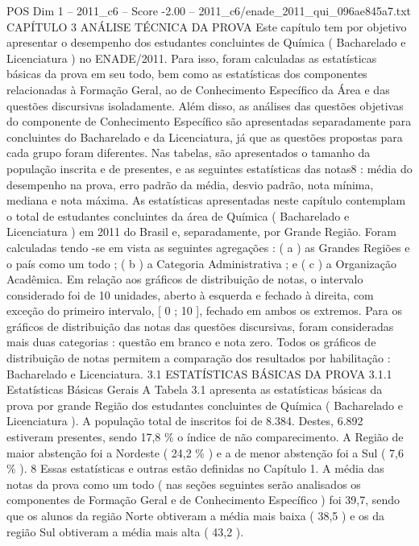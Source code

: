 \begin{textsample}{POS Dim 1 – 2011\_c6 – Score -2.00 – 2011\_c6/enade\_2011\_qui\_096ae845a7.txt}  \label{ex:f1_pos_218}
CAPÍTULO 3 ANÁLISE TÉCNICA DA PROVA Este capítulo tem por objetivo apresentar o desempenho dos estudantes concluintes de Química ( Bacharelado e Licenciatura ) no ENADE/2011.
Para isso, foram calculadas as estatísticas básicas da prova em seu todo, bem como as estatísticas dos componentes relacionadas à Formação Geral, ao de Conhecimento Específico da Área e das questões discursivas isoladamente.
Além disso, as análises das questões objetivas do componente de Conhecimento Específico são apresentadas separadamente para concluintes do Bacharelado e da Licenciatura, já que as questões propostas para cada grupo foram diferentes.
Nas tabelas, são apresentados o tamanho da população inscrita e de presentes, e as seguintes estatísticas das notas8 : média do desempenho na prova, erro padrão da média, desvio padrão, nota mínima, mediana e nota máxima.
As estatísticas apresentadas neste capítulo contemplam o total de estudantes concluintes da área de Química ( Bacharelado e Licenciatura ) em 2011 do Brasil e, separadamente, por Grande Região.
Foram calculadas tendo -se em vista as seguintes agregações : ( a ) as Grandes Regiões e o país como um todo ; ( b ) a Categoria Administrativa ; e ( c ) a Organização Acadêmica.
Em relação aos gráficos de distribuição de notas, o intervalo considerado foi de 10 unidades, aberto à esquerda e fechado à direita, com exceção do primeiro intervalo, [ 0 ; 10 ], fechado em ambos os extremos.
Para os gráficos de distribuição das notas das questões discursivas, foram consideradas mais duas categorias : questão em branco e nota zero.
Todos os gráficos de distribuição de notas permitem a comparação dos resultados por habilitação : Bacharelado e Licenciatura. 3.1 ESTATÍSTICAS BÁSICAS DA PROVA 3.1.1 Estatísticas Básicas Gerais A Tabela 3.1 apresenta as estatísticas básicas da prova por grande Região dos estudantes concluintes de Química ( Bacharelado e Licenciatura ).
A população total de inscritos foi de 8.384.
Destes, 6.892 estiveram presentes, sendo 17,8 \% o índice de não comparecimento.
A Região de maior abstenção foi a Nordeste ( 24,2 \% ) e a de menor abstenção foi a Sul ( 7,6 \% ). 8 Essas estatísticas e outras estão definidas no Capítulo 1.
A média das notas da prova como um todo ( nas seções seguintes serão analisados os componentes de Formação Geral e de Conhecimento Específico ) foi 39,7, sendo que os alunos da região Norte obtiveram a média mais baixa ( 38,5 ) e os da região Sul obtiveram a média mais alta ( 43,2 ).

\end{textsample}
